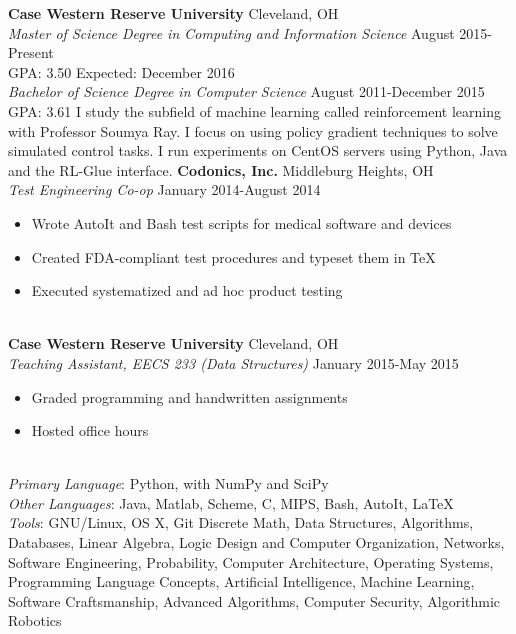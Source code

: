 \documentclass[11pt]{article}
\begin{document}
\begin{adjustwidth}{-2.2cm}{-2.2cm}
    \textbf{Case Western Reserve University} \hfill Cleveland, OH\\
    \emph{Master of Science Degree in Computing and Information Science} \hfill August 2015-Present\\
    GPA: 3.50 \hfill Expected: December 2016
    \\[2ex]
    \emph{Bachelor of Science Degree in Computer Science} \hfill August 2011-December 2015\\
    GPA: 3.61
    \eosec
    I study the subfield of machine learning called reinforcement learning with Professor Soumya Ray. I focus on using policy gradient techniques to solve simulated control tasks. I run experiments on CentOS servers using Python, Java and the RL-Glue interface.
    \eosec
    \textbf{Codonics, Inc.} \hfill Middleburg Heights, OH\\
    \emph{Test Engineering Co-op} \hfill January 2014-August 2014
    \begin{itemize}[nosep]
        \item Wrote AutoIt and Bash test scripts for medical software and devices
        \item Created FDA-compliant test procedures and typeset them in TeX
        \item Executed systematized and ad hoc product testing
    \end{itemize}
    ~\\[0.01\baselineskip]
    \textbf{Case Western Reserve University} \hfill Cleveland, OH\\
    \emph{Teaching Assistant, EECS 233 (Data Structures)} \hfill January 2015-May 2015
    \begin{itemize}[nosep]
        \item Graded programming and handwritten assignments
        \item Hosted office hours
    \end{itemize}
    ~\\[0.01\baselineskip]
    \emph{Primary Language}: Python, with NumPy and SciPy\\
    \emph{Other Languages}: Java, Matlab, Scheme, C, MIPS, Bash, AutoIt, LaTeX\\
    \emph{Tools}: GNU/Linux, OS X, Git
    \eosec
    Discrete Math, Data Structures, Algorithms, Databases, Linear Algebra, Logic Design and Computer Organization, Networks, Software Engineering, Probability, Computer Architecture, Operating Systems, Programming Language Concepts, Artificial Intelligence, Machine Learning, Software Craftsmanship, Advanced Algorithms, Computer Security, Algorithmic Robotics

\end{adjustwidth}
\end{document}
